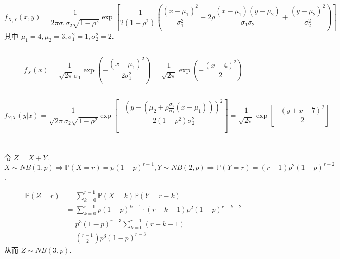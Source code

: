 \documentclass[8pt]{article}
\theoremstyle{compact}
\def\P#1{\mathbb{P}\left({#1}\right)}
\begin{document}
\section{}
\subsection{}
\begin{equation}
	f_{X, Y}(x, y) = \frac{1}{2\pi\sigma_1\sigma_2\sqrt{1 - \rho^2}} \exp\left[\frac{-1}{2(1 - \rho^2)}\left(\frac{(x - \mu_1)^2}{\sigma_1^2} - 2\rho\frac{(x - \mu_1)(y - \mu_2)}{\sigma_1\sigma_2} + \frac{(y - \mu_2)^2}{\sigma_2^2}\right)\right]
\end{equation}
其中 $\mu_1 = 4, \mu_2 = 3, \sigma_1^2 = 1, \sigma_2^2 = 2$.
\subsection{}
\begin{equation}
	f_X(x) = \frac{1}{\sqrt{2\pi}\sigma_1}\exp\left(-\frac{(x - \mu_1)^2}{2\sigma_1^2}\right) = \frac{1}{\sqrt{2\pi}}\exp\left(-\frac{(x - 4)^2}{2}\right)
\end{equation}
\subsection{}
\begin{equation}
	f_{Y|X}(y | x) = \frac{1}{\sqrt{2\pi}\sigma_2\sqrt{1 - \rho^2}}\exp\left[ -\frac{\left(y - (\mu_2 + \rho\frac{\sigma_2}{\sigma_1}(x - \mu_1))\right)^2}{2(1 - \rho^2)\sigma_2^2} \right] = \frac{1}{\sqrt{2\pi}}\exp\left[ -\frac{\left(y + x - 7\right)^2}{2} \right]
\end{equation}


\section{}
令 $Z = X + Y$. $X \sim NB(1, p) \Rightarrow \P{X = r} = p(1-p)^{r-1}, Y \sim NB(2, p) \Rightarrow \P{Y = r} = (r-1)p^2(1-p)^{r-2}$.

\begin{equation}
	\begin{split}
		\P{Z = r} &= \sum_{k=0}^{r-1}\P{X = k} \P{Y = r - k} \\
		&= \sum_{k=0}^{r-1}p(1-p)^{k-1} \cdot (r-k-1)p^2(1-p)^{r-k-2}\\
		&= p^3(1-p)^{r-3}\sum_{k=0}^{r-1}(r-k-1)\\
		&= \binom{r-1}{2}p^3(1-p)^{r-3}
	\end{split}
\end{equation}
从而 $Z \sim NB(3, p)$.
\end{document}
